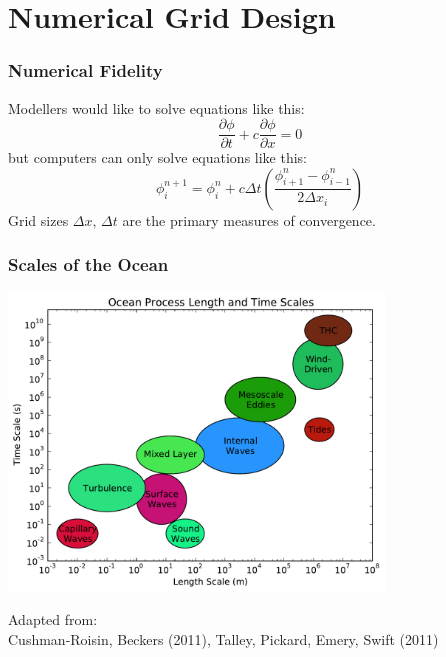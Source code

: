 \documentclass{beamer}
\begin{document}
\section{Numerical Grid Design}
\begin{frame}
    \frametitle{Numerical Fidelity}
    
    Modellers would like to solve equations like this:
    $$
    \frac{\partial \phi}{\partial t} + c \frac{\partial \phi}{\partial x} = 0
    $$
    but computers can only solve equations like this:
    $$
    \phi^{n+1}_i = \phi^n_i + c \Delta t
        \left(\frac{\phi^n_{i+1} - \phi^n_{i-1}}{2\Delta x_i} \right)
    $$
    Grid sizes $\Delta x$, $\Delta t$ are the primary measures of convergence.
\end{frame}

\begin{frame}
    \frametitle{Scales of the Ocean}
    
    \begin{center}
        \includegraphics[width=0.75\textwidth]{ocean_scales.pdf}
    \end{center}
    
    {\tiny Adapted from:\\
        Cushman-Roisin, Beckers (2011), Talley, Pickard, Emery, Swift (2011)}
\end{frame}
\end{document}
